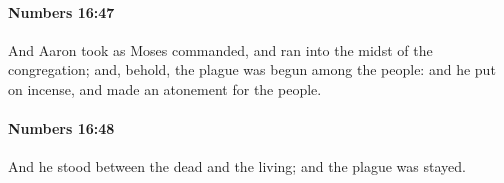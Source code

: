 		\paragraph{Numbers 16:47} %
			\label{NUMBERS-16-47}

			And Aaron took as Moses commanded, and ran into the midst of the congregation; and, behold, the plague was begun among the people: and he put on incense, and made an atonement for the people.


		\paragraph{Numbers 16:48} %
			\label{NUMBERS-16-48}

			And he stood between the dead and the living; and the plague was stayed.


